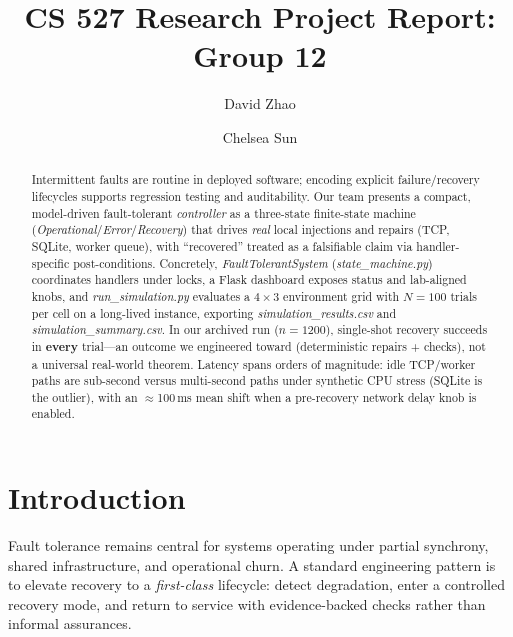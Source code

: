 \documentclass[sigconf,authorversion,nonacm]{acmart}
\begin{document}
\title{CS 527 Research Project Report: Group 12}


\author{David Zhao}
\author{Chelsea Sun}

\begin{abstract}
Intermittent faults are routine in deployed software; encoding explicit failure/recovery lifecycles supports regression testing and auditability. Our team presents a compact, model-driven fault-tolerant \emph{controller} as a three-state finite-state machine (\emph{Operational}/\emph{Error}/\emph{Recovery}) that drives \emph{real} local injections and repairs (TCP, SQLite, worker queue), with ``recovered'' treated as a falsifiable claim via handler-specific post-conditions. Concretely, \emph{FaultTolerantSystem} (\emph{state\_machine.py}) coordinates handlers under locks, a Flask dashboard exposes status and lab-aligned knobs, and \emph{run\_simulation.py} evaluates a $4{\times}3$ environment grid with $N{=}100$ trials per cell on a long-lived instance, exporting \emph{simulation\_results.csv} and \emph{simulation\_summary.csv}. In our archived run ($n{=}1200$), single-shot recovery succeeds in \textbf{every} trial---an outcome we engineered toward (deterministic repairs + checks), not a universal real-world theorem. Latency spans orders of magnitude: idle TCP/worker paths are sub-second versus multi-second paths under synthetic CPU stress (SQLite is the outlier), with an $\approx$100\,ms mean shift when a pre-recovery network delay knob is enabled.
\end{abstract}

\maketitle
\raggedbottom

\section{Introduction}
Fault tolerance remains central for systems operating under partial synchrony, shared infrastructure, and operational churn. A standard engineering pattern is to elevate recovery to a \emph{first-class} lifecycle: detect degradation, enter a controlled recovery mode, and return to service with evidence-backed checks rather than informal assurances.
\end{document}
